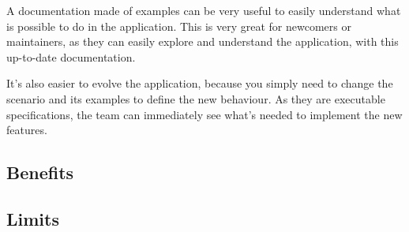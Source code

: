 A documentation made of examples can be very useful to easily understand
what is possible to do in the application.
This is very great for newcomers or maintainers, as they can easily explore
and understand the application, with this up-to-date documentation.

It's also easier to evolve the application, because you simply need to change
the scenario and its examples to define the new behaviour.
As they are executable specifications, the team can immediately see what's
needed to implement the new features.

\subsection{Benefits}\label{subsec:benefits}

\subsection{Limits}\label{subsec:limits}
